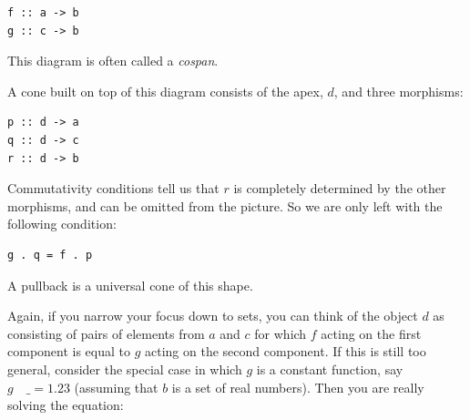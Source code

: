 \begin{Verbatim}
f :: a -> b
g :: c -> b
\end{Verbatim}

This diagram is often called a \emph{cospan}.

A cone built on top of this diagram consists of the apex, $d$,
and three morphisms:

\begin{Verbatim}
p :: d -> a
q :: d -> c
r :: d -> b
\end{Verbatim}

\begin{figure}[H]
\centering
{}
\end{figure}

\noindent
Commutativity conditions tell us that $r$ is completely
determined by the other morphisms, and can be omitted from the picture.
So we are only left with the following condition:

\begin{Verbatim}
g . q = f . p
\end{Verbatim}
A pullback is a universal cone of this shape.

\begin{figure}[H]
\centering
{}
\end{figure}

\noindent
Again, if you narrow your focus down to sets, you can think of the
object $d$ as consisting of pairs of elements from $a$ and
$c$ for which $f$ acting on the first component is equal
to $g$ acting on the second component. If this is still too
general, consider the special case in which $g$ is a constant
function, say $g \quad \_ = 1.23$ (assuming that $b$ is a set
of real numbers). Then you are really solving the equation:

